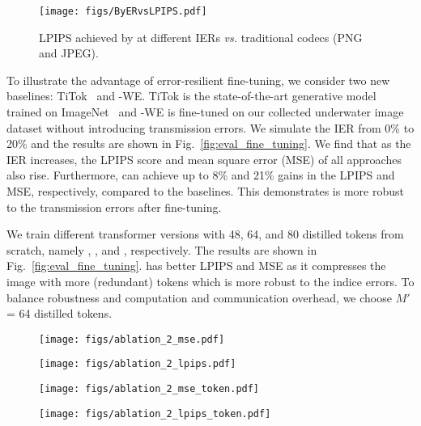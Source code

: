 \begin{figure}[t]
    \centering
    \texttt{[image: figs/ByERvsLPIPS.pdf]}
    \vspace{-8mm}
    \caption{LPIPS achieved by \sysname at different IERs \emph{vs.}
    traditional codecs (PNG and JPEG).}
    \label{fig:ByERvsLPIPS}
\end{figure}




To illustrate the advantage of error-resilient fine-tuning, we consider two new baselines: TiTok~\cite{yu2024image} and \sysname-WE. TiTok is the state-of-the-art generative model trained on ImageNet~\cite{imagenet15russakovsky} and \sysname-WE is fine-tuned on our collected underwater image dataset without introducing transmission errors. We simulate the IER from 0\% to 20\% and the results are shown in Fig.~\ref{fig:eval_fine_tuning}. We find that as the IER increases, the LPIPS score and mean square error (MSE) of all approaches also rise. Furthermore, \sysname can achieve up to 8\% and 21\% gains in the LPIPS and MSE, respectively, compared to the baselines. This demonstrates \sysname is more robust to the transmission errors after fine-tuning.



We train different transformer versions with 48, 64, and 80 distilled tokens from scratch, namely , , and , respectively.
The results are shown in Fig.~\ref{fig:eval_fine_tuning}.  has better LPIPS and MSE as it compresses the image with more (redundant) tokens which is more robust to the indice errors. To balance robustness and computation and communication overhead, we choose $M'$ = 64 distilled tokens.

\begin{figure*}[t]
    \centering
    \begin{subfigure}[b]{.24\linewidth}
        \centering
        \texttt{[image: figs/ablation\_2\_mse.pdf]}
        \label{fig:MSE_VS_IER_fine_tune}
    \end{subfigure}
    \begin{subfigure}[b]{.24\linewidth}
        \centering
        \texttt{[image: figs/ablation\_2\_lpips.pdf]}
        \label{fig:LPIPS_VS_IER_fine_tune}
    \end{subfigure}
        \begin{subfigure}[b]{.24\linewidth}
        \centering
        \texttt{[image: figs/ablation\_2\_mse\_token.pdf]}
        \label{fig:MSE_VS_IER_token}
    \end{subfigure}
    \begin{subfigure}[b]{.24\linewidth}
        \centering
        \texttt{[image: figs/ablation\_2\_lpips\_token.pdf]}
        \label{fig:LPIPS_VS_IER_token}
    \end{subfigure}
    \vspace{-5mm}
    \caption{Impact of fine-tuning and the number of distilled tokens $M'$
    on reconstructed image quality.}
    \label{fig:eval_fine_tuning}
    \vspace{3pt}
\end{figure*}


